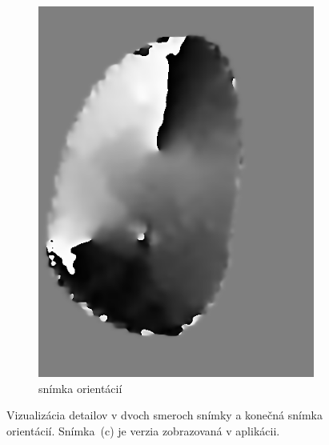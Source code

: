 \begin{figure}[h]
\begin{subfigure}[b]{0.3\linewidth}
      \includegraphics[width=\linewidth]{obrazky-figures/orientim.png}
      \caption{snímka orientácií}
    \end{subfigure}
    \caption{Vizualizácia detailov v dvoch smeroch snímky a konečná snímka orientácií. Snímka~(c) je verzia zobrazovaná v aplikácii.}
    \label{obr:orientacie}
  \end{figure}

